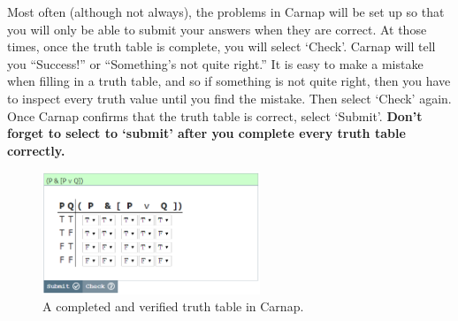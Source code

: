 Most often (although not always), the problems in Carnap will be set up so that you will only be able to submit your answers when they are correct. At those times, once the truth table is complete, you will select `Check'. Carnap will tell you ``Success!'' or ``Something's not quite right.'' It is easy to make a mistake when filling in a truth table, and so if something is not quite right, then you have to inspect every truth value until you find the mistake. Then select `Check' again. Once Carnap confirms that the truth table is correct, select `Submit'. \textbf{Don't forget to select to `submit' after you complete every truth table correctly.}

\begin{figure}
\centering
\includegraphics[width=6.5cm]{tt-6a.png} %
\caption{A completed and verified truth table in Carnap.}
\label{fig:tt-6}
\end{figure}



